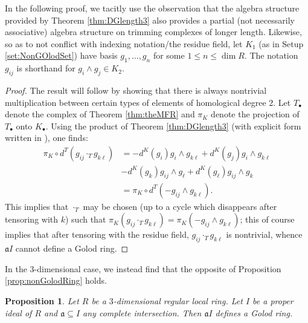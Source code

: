 \documentclass[10pt]{amsart}
\newtheorem{prop}[theorem]{Proposition}
\theoremstyle{definition}
\theoremstyle{remark}
\newtheorem{the context}[theorem]{The Context}
\numberwithin{equation}{theorem}
\numberwithin{equation}{section}
\renewcommand{\leq}{\leqslant}
\newcommand{\mfa}{\mathfrak{a}}
\def\w{\wedge}
\begin{document}
In the following proof, we tacitly use the observation that the algebra structure provided by Theorem \ref{thm:DGlength3} also provides a partial (not necessarily associative) algebra structure on trimming complexes of longer length. Likewise, so as to not conflict with indexing notation/the residue field, let $K_1$ (as in Setup \ref{set:NonGOlodSet}) have basis $g_1 , \dots , g_n$ for some $1 \leq n \leq \dim R$. The notation $g_{ij}$ is shorthand for $g_i \w g_j \in K_2$.

\begin{proof}
The result will follow by showing that there is always nontrivial multiplication between certain types of elements of homological degree $2$. Let $T_\bullet$ denote the complex of Theorem \ref{thm:theMFR} and $\pi_K$ denote the projection of $T_\bullet$ onto $K_\bullet$. Using the product of Theorem \ref{thm:DGlength3} (with explicit form written in \cite[Theorem 3.3]{vandebogert2020dg}), one finds:
\begingroup\allowdisplaybreaks
\begin{align*}
    \pi_K \circ d^T ( g_{ij} \cdot_T g_{k\ell} ) &= - d^K (g_i) g_i \w g_{k \ell} + d^K (g_j) g_i \w g_{k \ell} \\
    &- d^K (g_k) g_{ij} \w g_\ell + d^K (g_\ell) g_{ij} \w g_k \\
    &= \pi_K \circ d^T (- g_{ij} \w g_{k \ell} ).
\end{align*}
\endgroup
This implies that $\cdot_T$ may be chosen (up to a cycle which disappears after tensoring with $k$) such that $\pi_K (g_{ij} \cdot_T g_{k \ell}) =  \pi_K ( -g_{ij} \w g_{k \ell})$; this of course implies that after tensoring with the residue field, $g_{ij} \cdot_T g_{k \ell}$ is nontrivial, whence $\mfa I$ cannot define a Golod ring. 
\end{proof}

In the $3$-dimensional case, we instead find that the opposite of Proposition \ref{prop:nonGolodRing} holds.

\begin{prop}\label{prop:golodProdforleq3}
Let $R$ be a $3$-dimensional regular local ring. Let $I$ be a proper ideal of $R$ and $\mfa \subseteq I$ any complete intersection. Then $\mfa I$ defines a Golod ring.
\end{prop}
\end{document}
